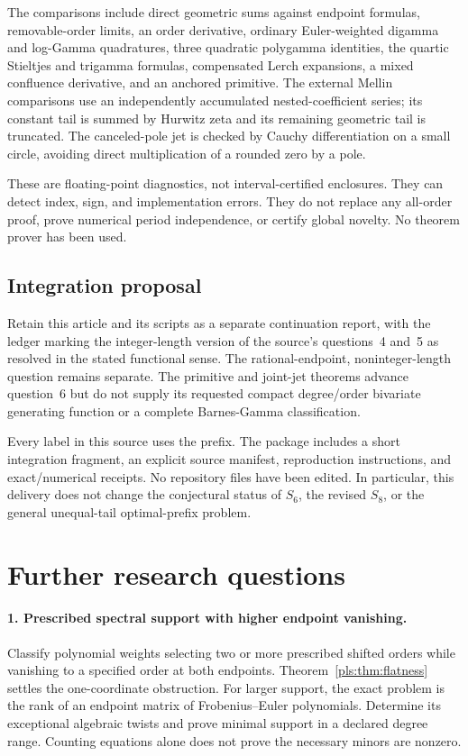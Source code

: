 \documentclass[11pt,letterpaper]{article}
\numberwithin{equation}{section}
\theoremstyle{definition}
\theoremstyle{remark}\newtheorem{remark}[theorem]{Remark}
\newcommand{\src}[1]{\texttt{\detokenize{#1}}}
\begin{document}
The comparisons include direct geometric sums against endpoint
formulas, removable-order limits, an order derivative, ordinary
Euler-weighted digamma and log-Gamma quadratures, three quadratic
polygamma identities, the quartic Stieltjes and trigamma formulas,
compensated Lerch expansions, a mixed confluence derivative, and an
anchored primitive. The external Mellin comparisons use an independently
accumulated nested-coefficient series; its constant tail is summed by
Hurwitz zeta and its remaining geometric tail is truncated. The
canceled-pole jet is checked by Cauchy differentiation on a small
circle, avoiding direct multiplication of a rounded zero by a pole.

These are floating-point diagnostics, not interval-certified enclosures.
They can detect index, sign, and implementation errors. They do not
replace any all-order proof, prove numerical period independence, or
certify global novelty. No theorem prover has been used.

\subsection{Integration proposal}

Retain this article and its scripts as a separate continuation report,
with the ledger marking the integer-length version of the source's
questions~4 and~5 as resolved in the stated functional sense.
The rational-endpoint, noninteger-length question remains separate.
The primitive and joint-jet theorems advance question~6 but do not
supply its requested compact degree/order bivariate generating function
or a complete Barnes-Gamma classification.

Every label in this source uses the \src{pls:} prefix. The package
includes a short integration fragment, an explicit source manifest,
reproduction instructions, and exact/numerical receipts. No repository
files have been edited. In particular, this delivery does not change
the conjectural status of $S_6$, the revised $S_8$, or the general
unequal-tail optimal-prefix problem.

\section{Further research questions}
\label{pls:sec:questions}

\paragraph{1. Prescribed spectral support with higher endpoint vanishing.}
Classify polynomial weights selecting two or more prescribed shifted
orders while vanishing to a specified order at both endpoints.
Theorem~\ref{pls:thm:flatness} settles the one-coordinate obstruction.
For larger support, the exact problem is the rank of an endpoint matrix
of Frobenius--Euler polynomials. Determine its exceptional algebraic
twists and prove minimal support in a declared degree range. Counting
equations alone does not prove the necessary minors are nonzero.
\end{document}
